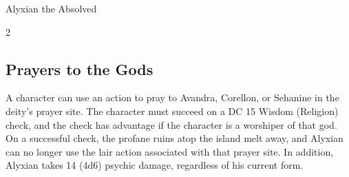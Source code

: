 \documentclass[10pt,a4paper,twoside,bg=none,twocolumn,openany,nodeprecatedcode]{dndbook}
\begin{document}
\begin{DndMonster}[float*=b,width=\textwidth + 8pt]{Alyxian the Absolved}
\begin{multicols}{2}
\begin{description}[nolistsep]
\end{description}

\subsection{Prayers to the Gods}
A character can use an action to pray to Avandra, Corellon, or Sehanine in the deity's prayer site. The character must succeed on a DC 15 Wisdom (Religion) check, and the check has advantage if the character is a worshiper of that god. On a successful check, the profane ruins atop the island melt away, and Alyxian can no longer use the lair action associated with that prayer site. In addition, Alyxian takes 14 (4d6) psychic damage, regardless of his current form.

\end{multicols}
\end{DndMonster}
\end{document}
